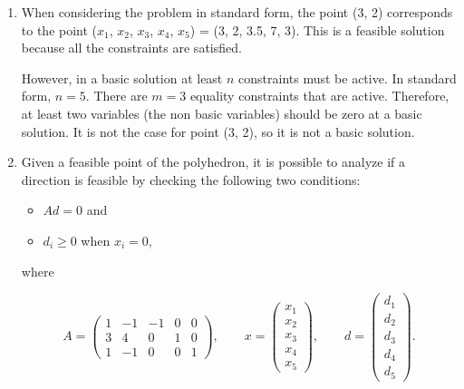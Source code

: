 \begin{enumerate}
\begin{itemize}
  \item A solution is feasible if it satisfies all the constraints of
    the problem. In order to calculate the basic solutions, we used
    the formula $x_B= \nolinebreak B^{-1}b$.  The non negativity
    constraints still need to be satisfied. The feasible solutions
    satisfies $$ x_i \geq 0, \quad \forall i \in {1,\ldots,5}.$$
    Therefore, the feasible basic solutions corresponds to the
    following points:
    \begin{center}
      B(0, 0), C(40/7, 12/7), D(4, 0), G(0, 2.5) and H(2, 4.5),
    \end{center}
    that happen to be the vertices of the polyhedron.


  \end{itemize}


\item When considering the problem in standard form,
  the point (3, 2) corresponds to the
  point ($ x_1 $, $ x_2 $, $ x_3 $,
  $ x_4 $, $ x_5 $) = (3, 2, 3.5, 7, 3). This is a feasible solution because all the constraints are
  satisfied.

  However,  in a basic solution at least $n$ constraints must be active.
  In standard form, $n=5$. There are $m=3$ equality constraints that are active.
  Therefore, at least two variables (the non basic variables) should be zero at a basic solution.
  It is not the case for point (3, 2), so it is not a basic solution.


\item Given a feasible point of the polyhedron, it is possible to analyze if a
  direction is feasible by checking the following two conditions:

  \begin{itemize}
  \item $Ad=0$ and
  \item $d_i \geq 0$ when $x_i=0$,
  \end{itemize}
  where

  \[
  A =
  \begin{pmatrix}
    1 & -1 & -1 & 0 & 0 \\
    3 & 4 & 0 & 1 & 0\\
    1 & -1 & 0 & 0 & 1
  \end{pmatrix}, \qquad
  x = \begin{pmatrix}
    x_1 \\
    x_2 \\
    x_3\\
    x_4\\
    x_5
  \end{pmatrix}, \qquad
  d = \begin{pmatrix}
    d_1 \\
    d_2 \\
    d_3 \\
    d_4 \\
    d_5
  \end{pmatrix}.
  \]



\end{enumerate}
